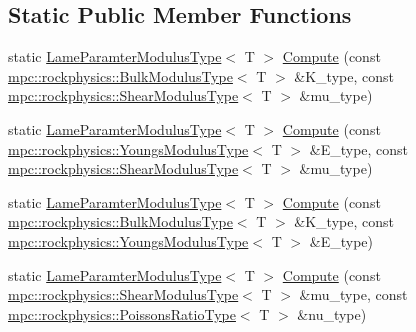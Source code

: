 \subsection*{Static Public Member Functions}
\begin{DoxyCompactItemize}
\item 
static \mbox{\hyperlink{structmpc_1_1rockphysics_1_1_lame_paramter_modulus_type}{Lame\+Paramter\+Modulus\+Type}}$<$ T $>$ \mbox{\hyperlink{structmpc_1_1rockphysics_1_1_rock_physics_transforms_3_01_t_00_01mpc_1_1rockphysics_1_1_lame_para5e1496021e3962f82419b3f52eb8942_a7988cdb91290059837fc3c1e6e2cb557}{Compute}} (const \mbox{\hyperlink{structmpc_1_1rockphysics_1_1_bulk_modulus_type}{mpc\+::rockphysics\+::\+Bulk\+Modulus\+Type}}$<$ T $>$ \&K\+\_\+type, const \mbox{\hyperlink{structmpc_1_1rockphysics_1_1_shear_modulus_type}{mpc\+::rockphysics\+::\+Shear\+Modulus\+Type}}$<$ T $>$ \&mu\+\_\+type)
\item 
static \mbox{\hyperlink{structmpc_1_1rockphysics_1_1_lame_paramter_modulus_type}{Lame\+Paramter\+Modulus\+Type}}$<$ T $>$ \mbox{\hyperlink{structmpc_1_1rockphysics_1_1_rock_physics_transforms_3_01_t_00_01mpc_1_1rockphysics_1_1_lame_para5e1496021e3962f82419b3f52eb8942_af22a8bb90cf5cf619f3f4510382b164e}{Compute}} (const \mbox{\hyperlink{structmpc_1_1rockphysics_1_1_youngs_modulus_type}{mpc\+::rockphysics\+::\+Youngs\+Modulus\+Type}}$<$ T $>$ \&E\+\_\+type, const \mbox{\hyperlink{structmpc_1_1rockphysics_1_1_shear_modulus_type}{mpc\+::rockphysics\+::\+Shear\+Modulus\+Type}}$<$ T $>$ \&mu\+\_\+type)
\item 
static \mbox{\hyperlink{structmpc_1_1rockphysics_1_1_lame_paramter_modulus_type}{Lame\+Paramter\+Modulus\+Type}}$<$ T $>$ \mbox{\hyperlink{structmpc_1_1rockphysics_1_1_rock_physics_transforms_3_01_t_00_01mpc_1_1rockphysics_1_1_lame_para5e1496021e3962f82419b3f52eb8942_a14a1a45f749bee414ab372281bce645e}{Compute}} (const \mbox{\hyperlink{structmpc_1_1rockphysics_1_1_bulk_modulus_type}{mpc\+::rockphysics\+::\+Bulk\+Modulus\+Type}}$<$ T $>$ \&K\+\_\+type, const \mbox{\hyperlink{structmpc_1_1rockphysics_1_1_youngs_modulus_type}{mpc\+::rockphysics\+::\+Youngs\+Modulus\+Type}}$<$ T $>$ \&E\+\_\+type)
\item 
static \mbox{\hyperlink{structmpc_1_1rockphysics_1_1_lame_paramter_modulus_type}{Lame\+Paramter\+Modulus\+Type}}$<$ T $>$ \mbox{\hyperlink{structmpc_1_1rockphysics_1_1_rock_physics_transforms_3_01_t_00_01mpc_1_1rockphysics_1_1_lame_para5e1496021e3962f82419b3f52eb8942_a5a4fe1e8eaddbdc374c7600dfef8e459}{Compute}} (const \mbox{\hyperlink{structmpc_1_1rockphysics_1_1_shear_modulus_type}{mpc\+::rockphysics\+::\+Shear\+Modulus\+Type}}$<$ T $>$ \&mu\+\_\+type, const \mbox{\hyperlink{structmpc_1_1rockphysics_1_1_poissons_ratio_type}{mpc\+::rockphysics\+::\+Poissons\+Ratio\+Type}}$<$ T $>$ \&nu\+\_\+type)

\end{DoxyCompactItemize}
